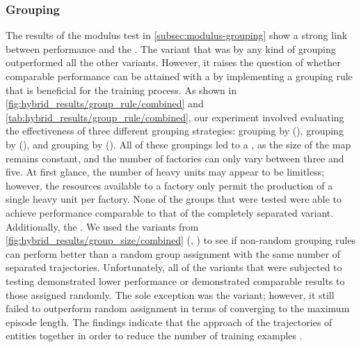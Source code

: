 \subsubsection{Grouping}
\label{sec:res-grouping}

\noindent The results of the modulus test in \autoref{subsec:modulus-grouping} show a strong link between performance and the . The variant that was  by any kind of grouping outperformed all the other variants. However, it raises the question of whether comparable performance can be attained with a  by implementing a grouping rule that is beneficial for the training process. As shown in \autoref{fig:hybrid_results/group_rule/combined} and \autoref{tab:hybrid_results/group_rule/combined}, our experiment involved evaluating the effectiveness of three different grouping strategies: grouping by  (), grouping by  (), and grouping by  (). All of these groupings led to a , as the size of the map remains constant, and the number of factories can only vary between three and five. At first glance, the number of heavy units may appear to be limitless; however, the resources available to a factory only permit the production of a single heavy unit per factory. None of the groups that were tested were able to achieve performance comparable to that of the completely separated variant. Additionally, the . We used the  variants from \autoref{fig:hybrid_results/group_size/combined} (, ) to see if non-random grouping rules can perform better than a random group assignment with the same number of separated trajectories. Unfortunately, all of the variants that were subjected to testing demonstrated lower performance or demonstrated comparable results to those assigned randomly. The sole exception was the  variant; however, it still failed to outperform random assignment in terms of converging to the maximum episode length. The findings indicate that the approach of  the trajectories of entities together in order to reduce the number of training examples .

